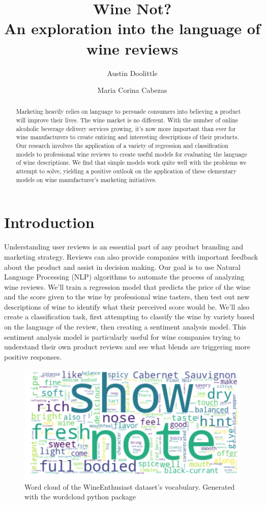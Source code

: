 \documentclass[12pt]{IEEEtran}
\title{
    Wine Not? \\
    \large An exploration into the language of wine reviews
}
\author[1]{Austin Doolittle}
\author[1]{Maria Corina Cabezas}
\affil[1]{
    University of California, Berkeley
    \authorcr{\tt \{austin.doolittle, m.cabezas95\}@berkeley.edu}\vspace{1.5ex}
}
\begin{document}
\maketitle
\begin{abstract}
    Marketing heavily relies on language to persuade consumers into believing a product will improve their lives. The wine market is no different. With the number of online alcoholic beverage delivery services growing, it's now more important than ever for wine manufacturers to create enticing and interesting descriptions of their products. Our research involves the application of a variety of regression and classification models to professional wine reviews to create useful models for evaluating the language of wine descriptions. We find that simple models work quite well with the problems we attempt to solve, yielding a positive outlook on the application of these elementary models on wine manufacturer's marketing initiatives.
\end{abstract}

\section{Introduction}
    Understanding user reviews is an essential part of any product branding and marketing strategy. Reviews can also provide companies with important feedback about the product and assist in decision making. Our goal is to use Natural Language Processing (NLP) algorithms to automate the process of analyzing wine reviews. We'll train a regression model that predicts the price of the wine and the score given to the wine by professional wine tasters, then test out new descriptions of wine to identify what their perceived score would be. We'll also create a classification task, first attempting to classify the wine by variety based on the language of the review, then creating a sentiment analysis model. This sentiment analysis model is particularly useful for wine companies trying to understand their own product reviews and see what blends are triggering more positive responses. 

    \begin{figure}
        \centering
        \includegraphics[width=\columnwidth]{wordcloud}
        \caption{Word cloud of the WineEnthusiast dataset's vocabulary. Generated with the wordcloud python package\cite{wordcloud}}
    \end{figure}
\end{document}
